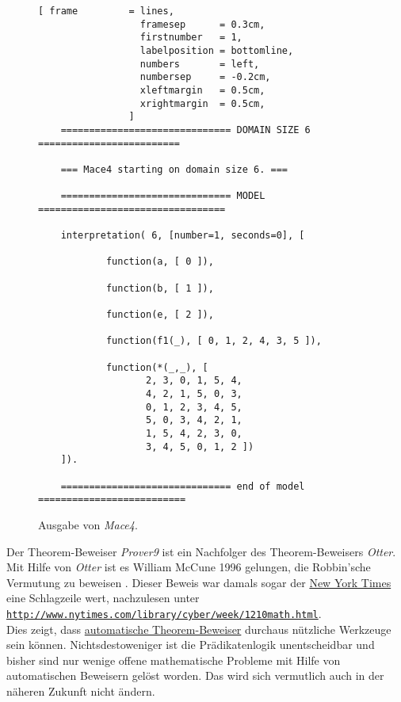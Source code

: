 \begin{figure}[!ht]
\centering
\begin{Verbatim}[ frame         = lines, 
                  framesep      = 0.3cm, 
                  firstnumber   = 1,
                  labelposition = bottomline,
                  numbers       = left,
                  numbersep     = -0.2cm,
                  xleftmargin   = 0.5cm,
                  xrightmargin  = 0.5cm,
                ]
    ============================== DOMAIN SIZE 6 =========================
    
    === Mace4 starting on domain size 6. ===
    
    ============================== MODEL =================================
    
    interpretation( 6, [number=1, seconds=0], [
    
            function(a, [ 0 ]),
    
            function(b, [ 1 ]),
    
            function(e, [ 2 ]),
    
            function(f1(_), [ 0, 1, 2, 4, 3, 5 ]),
    
            function(*(_,_), [
    			   2, 3, 0, 1, 5, 4,
    			   4, 2, 1, 5, 0, 3,
    			   0, 1, 2, 3, 4, 5,
    			   5, 0, 3, 4, 2, 1,
    			   1, 5, 4, 2, 3, 0,
    			   3, 4, 5, 0, 1, 2 ])
    ]).
    
    ============================== end of model ==========================
\end{Verbatim}
\vspace*{-0.3cm}
\caption{Ausgabe von \textsl{Mace4}.}
\label{fig:group.out}
\end{figure}

\remark
Der Theorem-Beweiser \textsl{Prover9} ist ein Nachfolger des Theorem-Beweisers \textsl{Otter}.  Mit Hilfe von
\textsl{Otter} ist es William McCune 1996 gelungen, die Robbin'sche Vermutung zu beweisen \cite{mccune:1997}.
Dieser Beweis war damals sogar der \href{http://www.nytimes.com/}{New York Times} eine Schlagzeile wert,
nachzulesen unter
\\[0.2cm]
\hspace*{1.3cm}
\href{http://www.nytimes.com/library/cyber/week/1210math.html}{\texttt{http://www.nytimes.com/library/cyber/week/1210math.html}}.
\\[0.2cm]
Dies zeigt, dass \href{https://en.wikipedia.org/wiki/Automated_theorem_proving}{automatische Theorem-Beweiser}
durchaus nützliche Werkzeuge sein können.  Nichtsdestoweniger ist die Prädikatenlogik unentscheidbar und bisher
sind  nur wenige offene mathematische Probleme mit Hilfe von automatischen Beweisern gelöst worden.  Das wird
sich vermutlich auch in der näheren Zukunft nicht ändern.  \eox

